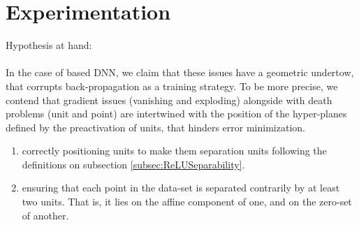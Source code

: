 \section{Experimentation}\label{sec:experiments}
Hypothesis at hand:\\\\
In the case of \ReLU based DNN, we claim that these issues have a geometric undertow, that corrupts back-propagation as a training strategy. To be more precise, we contend that gradient issues (vanishing and exploding) alongside with death problems (unit and point) are intertwined with the position of the hyper-planes defined by the preactivation of \ReLU units, that hinders error minimization.
\begin{enumerate}
    \item correctly positioning units to make them separation units following the definitions on subsection \ref{subsec:ReLUSeparability}.
    \item ensuring that each point in the data-set is separated contrarily by at least two units. That is, it lies on the affine component of one, and on the zero-set of another. 
\end{enumerate}
